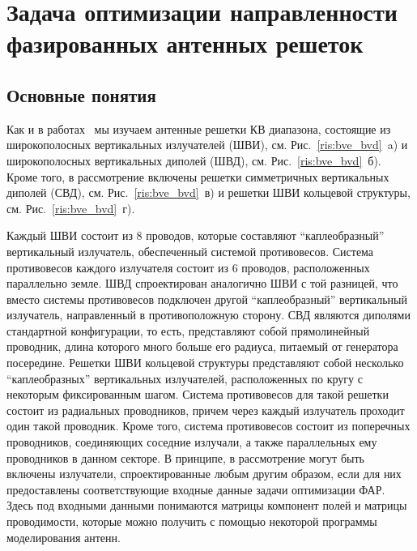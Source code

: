 \chapter{Задача оптимизации направленности фазированных антенных решеток}\label{ch:ch1}

\section{Основные понятия}

Как и в работах~\cite{yurkov:groundloss,yurkov:knd} мы изучаем антенные решетки КВ диапазона, состоящие из широкополосных вертикальных
излучателей (ШВИ), см. Рис.~\ref{ris:bve_bvd}~a) и широкополосных вертикальных диполей (ШВД), см. Рис.~\ref{ris:bve_bvd}~б). Кроме того, в
рассмотрение включены решетки симметричных вертикальных диполей (СВД), см. Рис.~\ref{ris:bve_bvd}~в) и решетки ШВИ кольцевой структуры, см. Рис.~\ref{ris:bve_bvd}~г).

Каждый ШВИ состоит из 8 проводов, которые составляют ``каплеобразный'' вертикальный излучатель, обеспеченный системой противовесов.
Система противовесов каждого излучателя состоит из 6 проводов, расположенных параллельно земле. ШВД спроектирован аналогично ШВИ с той
разницей, что вместо системы противовесов подключен другой ``каплеобразный'' вертикальный излучатель, направленный в противоположную сторону. СВД являются диполями стандартной конфигурации, то есть, представляют собой прямолинейный проводник, длина которого много
больше его радиуса, питаемый от генератора посередине. Решетки ШВИ кольцевой структуры представляют собой несколько ``каплеобразных''
вертикальных излучателей, расположенных по кругу с некоторым фиксированным шагом. Система противовесов для такой решетки состоит из
радиальных проводников, причем через каждый излучатель проходит один такой проводник. Кроме того, система противовесов состоит из поперечных проводников, соединяющих соседние излучали, а также параллельных ему проводников в данном секторе. В принципе, в рассмотрение могут быть включены излучатели, спроектированные любым другим образом, если для них предоставлены соответствующие входные данные задачи оптимизации ФАР. Здесь под входными данными понимаются матрицы компонент полей и матрицы проводимости, которые можно получить с помощью некоторой программы моделирования антенн.

